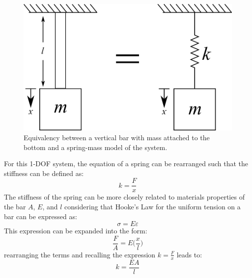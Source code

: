 \documentclass[12pt,letter]{article}
\numberwithin{ex}{section} %
\numberwithin{re}{section} %
\numberwithin{vcs}{section} %
\begin{document}
			
			\begin{figure}[H]
				\centering
				\includegraphics[]{../figures/spring_and_bar_mass_vertical.png}
				\caption{Equivalency between a vertical bar with mass attached to the bottom and a spring-mass model of the system.}
				\label{fig:spring_and_bar_mass_vertical}
			\end{figure}
			
			For this 1-DOF system, the equation of a spring can be rearranged such that the stiffness can be defined as:
			\begin{equation}
				k=\frac{F}{x}
			\end{equation}
			The stiffness of the spring can be more closely related to materials properties of the bar $A$, $E$, and $l$ considering that Hooke's Law for the uniform tension on a bar can be expressed as:
			\begin{equation}
				\sigma = E \varepsilon
			\end{equation}			
			This expression can be expanded into the form:
			\begin{equation}
				\frac{F}{A} = E \Big( \frac{x}{l} \Big)
			\end{equation}					
			rearranging the terms and recalling the expression $k = \frac{F}{x}$ leads to:			
			\begin{equation}
				 k = \frac{EA}{l}
			\end{equation}				
		
\end{document}
